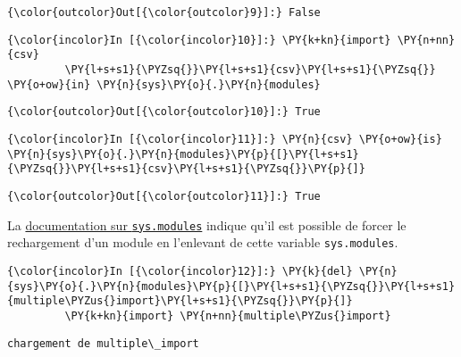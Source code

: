 \begin{Verbatim}[commandchars=\\\{\}]
{\color{outcolor}Out[{\color{outcolor}9}]:} False
\end{Verbatim}
            
    \begin{Verbatim}[commandchars=\\\{\}]
{\color{incolor}In [{\color{incolor}10}]:} \PY{k+kn}{import} \PY{n+nn}{csv}
         \PY{l+s+s1}{\PYZsq{}}\PY{l+s+s1}{csv}\PY{l+s+s1}{\PYZsq{}} \PY{o+ow}{in} \PY{n}{sys}\PY{o}{.}\PY{n}{modules}
\end{Verbatim}


\begin{Verbatim}[commandchars=\\\{\}]
{\color{outcolor}Out[{\color{outcolor}10}]:} True
\end{Verbatim}
            
    \begin{Verbatim}[commandchars=\\\{\}]
{\color{incolor}In [{\color{incolor}11}]:} \PY{n}{csv} \PY{o+ow}{is} \PY{n}{sys}\PY{o}{.}\PY{n}{modules}\PY{p}{[}\PY{l+s+s1}{\PYZsq{}}\PY{l+s+s1}{csv}\PY{l+s+s1}{\PYZsq{}}\PY{p}{]}
\end{Verbatim}


\begin{Verbatim}[commandchars=\\\{\}]
{\color{outcolor}Out[{\color{outcolor}11}]:} True
\end{Verbatim}
            
    La
\href{https://docs.python.org/3/library/sys.html\#sys.modules}{documentation
sur \texttt{sys.modules}} indique qu'il est possible de forcer le
rechargement d'un module en l'enlevant de cette variable
\texttt{sys.modules}.

    \begin{Verbatim}[commandchars=\\\{\}]
{\color{incolor}In [{\color{incolor}12}]:} \PY{k}{del} \PY{n}{sys}\PY{o}{.}\PY{n}{modules}\PY{p}{[}\PY{l+s+s1}{\PYZsq{}}\PY{l+s+s1}{multiple\PYZus{}import}\PY{l+s+s1}{\PYZsq{}}\PY{p}{]}
         \PY{k+kn}{import} \PY{n+nn}{multiple\PYZus{}import}
\end{Verbatim}


    \begin{Verbatim}[commandchars=\\\{\}]
chargement de multiple\_import

    \end{Verbatim}

